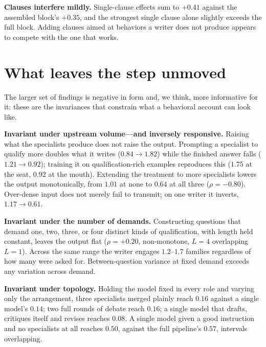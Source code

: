 \documentclass[11pt]{article}
\begin{document}
\textbf{Clauses interfere mildly.} Single-clause effects sum to $+0.41$
against the assembled block's $+0.35$, and the strongest single clause alone
slightly exceeds the full block. Adding clauses aimed at behaviors a writer
does not produce appears to compete with the one that works.

\section{What leaves the step unmoved}
\label{sec:inv}
The larger set of findings is negative in form and, we think, more informative
for it: these are the invariances that constrain what a behavioral account can
look like.

\textbf{Invariant under upstream volume---and inversely responsive.} Raising
what the specialists produce does not raise the output. Prompting a specialist
to qualify more doubles what it writes ($0.84 \rightarrow 1.82$) while the
finished answer falls ($1.21 \rightarrow 0.92$); training it on
qualification-rich examples reproduces this ($1.75$ at the seat, $0.92$ at the
mouth). Extending the treatment to more specialists lowers the output
monotonically, from $1.01$ at none to $0.64$ at all three ($\rho = -0.80$).
Over-dense input does not merely fail to transmit; on one writer it inverts,
$1.17 \rightarrow 0.61$.

\textbf{Invariant under the number of demands.} Constructing questions that
demand one, two, three, or four distinct kinds of qualification, with length
held constant, leaves the output flat ($\rho = +0.20$, non-monotone, $L{=}4$
overlapping $L{=}1$). Across the same range the writer engages $1.2$--$1.7$
families regardless of how many were asked for. Between-question variance at
fixed demand exceeds any variation across demand.

\textbf{Invariant under topology.} Holding the model fixed in every role and
varying only the arrangement, three specialists merged plainly reach $0.16$
against a single model's $0.14$; two full rounds of debate reach $0.16$; a
single model that drafts, critiques itself and revises reaches $0.08$. A
single model given a good instruction and no specialists at all reaches $0.50$,
against the full pipeline's $0.57$, intervals overlapping.
\end{document}
